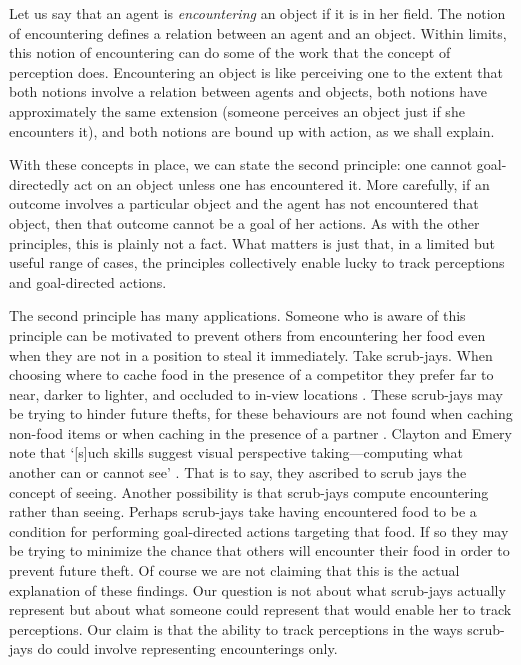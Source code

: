 \documentclass[12pt,\papersize]{extarticle}
\begin{document}
Let us say that an agent is \textit{encountering} an object if it is in her field.  The notion of encountering defines a relation between an agent and an object.  Within limits, this notion of encountering can do some of the work that the concept of perception does.  Encountering an object is like perceiving one to the extent that both notions involve a relation between agents and objects, both notions have approximately the same extension (someone perceives an object just if she encounters it), and both notions are bound up with action, as we shall explain.  

With these concepts in place, we can state the second principle: 
one cannot goal-directedly act on an object unless one has encountered it.  
More carefully,
if an outcome involves a particular object
and the agent has not encountered that object,
then that outcome cannot be a goal of her actions.
As with the other principles, this is plainly not a fact.
What matters is just that, in a limited but useful range of cases, the principles collectively enable lucky to track perceptions and goal-directed actions.

The second principle has many applications.  Someone who is aware of this principle can be motivated to prevent others from encountering her food even when they are not in a position to steal it immediately.  Take scrub-jays.  When choosing where to cache food in the presence of a competitor they prefer far to near, darker to lighter, and occluded to in-view locations \citep[]{en_1451, en_1452}.  These scrub-jays may be trying to hinder future thefts, for these behaviours are not found when caching non-food items \citep[]{en_1419} or when caching in the presence of a partner \citep[][p.\ 514]{en_1418, en_1408}.  Clayton and Emery note that `[s]uch skills suggest visual perspective taking—computing what another can or cannot see' \citep[]{en_1451}. That is to say, they ascribed to scrub jays the concept of seeing.  Another possibility is that scrub-jays compute encountering rather than seeing.  Perhaps scrub-jays take having encountered food to be a condition for performing goal-directed actions targeting that food.  If so they may be trying to minimize the chance that others will encounter their food in order to prevent future theft.  
Of course we  are not claiming that this is the actual explanation of these findings.  
Our question is not about what scrub-jays actually represent but about what someone could represent that would enable her to track perceptions.
Our claim is that the ability to track perceptions in the ways scrub-jays do could involve representing encounterings only.
\end{document}
